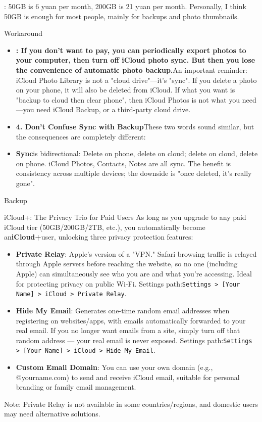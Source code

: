 
: 50GB is 6 yuan per month, 200GB is 21 yuan per month. Personally, I think 50GB is enough for most people, mainly for backups and photo thumbnails.

Workaround

\begin{itemize}
  \item \textbf{: If you don't want to pay, you can periodically export photos to your computer, then turn off iCloud photo sync. But then you lose the convenience of automatic photo backup.}An important reminder: iCloud Photo Library is not a "cloud drive"—it's "sync". If you delete a photo on your phone, it will also be deleted from iCloud. If what you want is "backup to cloud then clear phone", then iCloud Photos is not what you need—you need iCloud Backup, or a third-party cloud drive.
  \item \textbf{4. Don't Confuse Sync with Backup}These two words sound similar, but the consequences are completely different:
  \item \textbf{Sync}is bidirectional: Delete on phone, delete on cloud; delete on cloud, delete on phone. iCloud Photos, Contacts, Notes are all sync. The benefit is consistency across multiple devices; the downside is "once deleted, it's really gone".
\end{itemize}

Backup

\begin{tcbinfo}{iCloud+: The Privacy Trio for Paid Users}
As long as you upgrade to any paid iCloud tier (50GB/200GB/2TB, etc.), you automatically become an\textbf{iCloud+}user, unlocking three privacy protection features:

\begin{itemize}
  \item \textbf{Private Relay}: Apple's version of a "VPN." Safari browsing traffic is relayed through Apple servers before reaching the website, so no one (including Apple) can simultaneously see who you are and what you're accessing. Ideal for protecting privacy on public Wi-Fi. Settings path:\texttt{Settings > [Your Name] > iCloud > Private Relay}.
  \item \textbf{Hide My Email}: Generates one-time random email addresses when registering on websites/apps, with emails automatically forwarded to your real email. If you no longer want emails from a site, simply turn off that random address — your real email is never exposed. Settings path:\texttt{Settings > [Your Name] > iCloud > Hide My Email}.
  \item \textbf{Custom Email Domain}: You can use your own domain (e.g., @yourname.com) to send and receive iCloud email, suitable for personal branding or family email management.
\end{itemize}

Note: Private Relay is not available in some countries/regions, and domestic users may need alternative solutions.

\end{tcbinfo}

